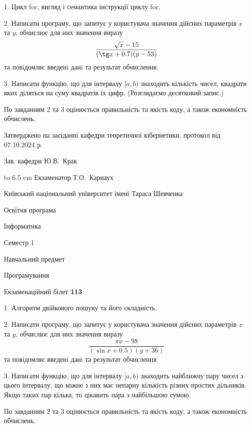 \documentclass[12pt, ukrainian]{article}
\begin{document}
{%
1. Цикл for, вигляд і семантика інструкції циклу for.%
\par
2. Написати програму, що запитує у користувача значення дійсних параметрів $x$ та $y$, обчислює для них значення виразу 
$$\frac{\sqrt x - 15}{(\tg x + 0.7) (y - 53)}$$ 
та повiдомляє введенi данi та результат обчислення.

\par
3. Написати функцію, що для інтервалу $[a, b)$ знаходить кількість чисел, квадрати яких діляться на суму квадратів їх цифр. (Розглядаємо десятковий запис.)

По завданням 2 та 3 оцінюється правильність та якість коду, а також економність обчислень.

}
{\smallskip\smallskip \begin {scriptsize} Затверджено на засіданні кафедри теоретичної кібернетики, протокол   від   07.10.2024 р.\par\smallskip\smallskip\smallskip\smallskip
{\parbox {6.5 cm} {Зав. кафедри \dotfill Ю.В.~Крак}}\hspace {0.7cm} {\hbox to 6.5 cm { Екзаменатор \dotfill Т.О.~Карнаух}} \end{scriptsize}}
\vspace{0.9cm}
{{\begin {scriptsize}\par
{ \center  Київський національний університет імені Тараса Шевченка \par}
{\parbox {5 cm}{Освітня програма \hfill}{\parbox {7 cm}{Інформатика\hfill}}\parbox {6 cm}{\hfill Семестр 1}}\par
{\parbox {5 cm} {Навчальний предмет \hfill}\parbox {7 cm}{Програмування \hfill}\parbox {6cm}{\hfill}\par}\vspace{-15pt} \end{scriptsize}}{\center Екзаменаційний білет \No \textbf { 113 }\par}}
{%
1. Алгоритм двійкового пошуку та його складність.%
\par
2. Написати програму, що запитує у користувача значення дійсних параметрів $x$ та $y$, обчислює для них значення виразу 
$$\frac{\pi x - 98}{(\sin x + 0.5) (y + 36)}$$ 
та повiдомляє введенi данi та результат обчислення.

\par
3. Написати функцію, що для інтервалу $[a, b)$ знаходить найближчу пару чисел з цього інтервалу, що кожне з них має непарну кількість різних простих дільників. Якщо таких пар кілька, то цікавить пара з найбільшою сумою.

По завданням 2 та 3 оцінюється правильність та якість коду, а також економність обчислень.

}
\end{document}
